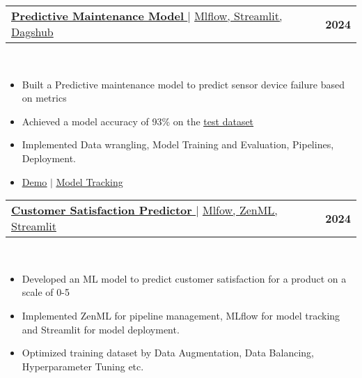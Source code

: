 \documentclass[letterpaper,11pt]{article}
\makeatletter
\newcommand{\resumeItem}[1]{
  \item\small{
    {#1 \vspace{-2pt}}
  }
}
\newcommand{\resumeProjectHeading}[2]{
    \item
    \begin{tabular*}{1.001\textwidth}{l@{\extracolsep{\fill}}r}
      \small#1 & \textbf{\small #2}\\
    \end{tabular*}\vspace{-7pt}
}
\newcommand{\resumeItemListStart}{\begin{itemize}}
\newcommand{\resumeItemListEnd}{\end{itemize}\vspace{-5pt}}
\makeatother
\begin{document}
        \resumeProjectHeading
        {\href{https://github.com/typhonshambo/End-to-End-ML-Pipeline-for-Predictive-Maintenance/tree/main}{\textbf{\large{\underline{Predictive Maintenance Model}}} \href{https://github.com/typhonshambo/End-to-End-ML-Pipeline-for-Predictive-Maintenance/tree/main}{\raisebox{-0.1\height}\faExternalLink}} $|$ \large{\underline{Mlflow, Streamlit, Dagshub}}}{2024}\\
        \resumeItemListStart
          \resumeItem{\normalsize{Built a Predictive maintenance model to predict sensor device failure based on metrics}}
          \resumeItem{\normalsize{Achieved a model accuracy of 93\% on the \href{https://typhonshambo-predictive-maintenance.streamlit.app}{\underline{test dataset }}\faExternalLink}}
          \resumeItem{\normalsize{Implemented Data wrangling, Model Training and Evaluation, Pipelines, Deployment.}}
          \resumeItem{\normalsize{\href{https://typhonshambo-predictive-maintenance.streamlit.app}{\underline{Demo}} \href{https://typhonshambo-predictive-maintenance.streamlit.app}{\raisebox{-0.1\height}\faExternalLink}} $|$ \href{https://dagshub.com/typhonshambo/End-to-End-ML-Pipeline-for-Predictive-Maintenance.mlflow}{\underline{Model Tracking}} \href{https://dagshub.com/typhonshambo/End-to-End-ML-Pipeline-for-Predictive-Maintenance.mlflow}{\raisebox{-0.1\height}\faExternalLink}}
        \resumeItemListEnd
      \vspace{-13pt}
  
  
                  
      \resumeProjectHeading
      {\href{https://github.com/typhonshambo/customer-satisfaction-predictor}{\textbf{\large{\underline{\textbf{Customer Satisfaction Predictor}}}} \href{Project Link}{\raisebox{-0.1\height}\faExternalLink }} $|$ \large{\underline{Mlfow, ZenML, Streamlit}}}{2024}\\
      \resumeItemListStart
        \resumeItem {\normalsize{Developed an ML model to predict customer satisfaction for a product on a scale of 0-5}}
        \resumeItem{\normalsize{Implemented ZenML for pipeline management, MLflow for model tracking and Streamlit for model deployment.}}
        \resumeItem{\normalsize{Optimized training dataset by Data Augmentation, Data Balancing, Hyperparameter Tuning etc.}}
      \resumeItemListEnd 
      \vspace{-13pt}
      
\end{document}
